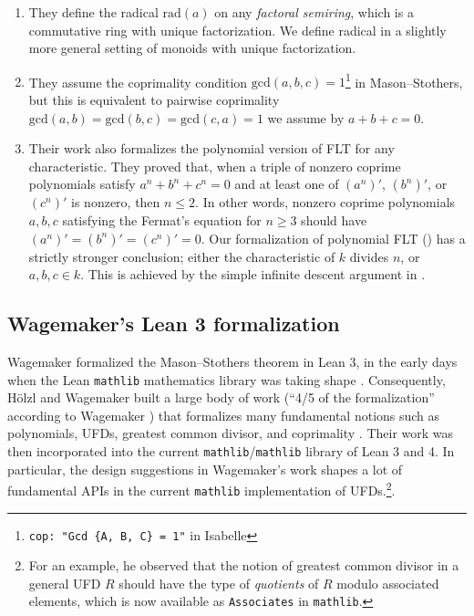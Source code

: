 \documentclass[runningheads]{llncs}
\newcommand{\rad}{\mathrm{rad}}
\begin{document}
\begin{enumerate}
\item They define the radical $\rad(a)$ on any \emph{factoral semiring}, which is a commutative ring with unique factorization. We define radical in a slightly more general setting of monoids with unique factorization.  

\item They assume the coprimality condition $\mathrm{gcd}(a, b, c) = 1$\footnote{\texttt{cop: "Gcd \{A, B, C\} = 1"} in Isabelle} in Mason--Stothers, but this is equivalent to pairwise coprimality $\mathrm{gcd}(a, b) = \mathrm{gcd}(b, c) = \mathrm{gcd}(c, a) = 1$ we assume by $a+b+c=0$.

\item Their work also formalizes the polynomial version of FLT for any characteristic.
They proved that, when a triple of nonzero coprime polynomials satisfy $a^n + b^n + c^n = 0$ and at least one of $(a^n)'$, $(b^n)'$, or $(c^n)'$ is nonzero,
 then $n \le 2$.
In other words, nonzero coprime polynomials $a, b, c$ satisfying the Fermat's equation for $n \ge 3$ should have $(a^n)' = (b^n)' = (c^n)' = 0$.
Our formalization of polynomial FLT () has a strictly stronger conclusion; either the characteristic of $k$ divides $n$, or $a, b, c \in k$.
This is achieved by the simple infinite descent argument in .
\end{enumerate}

\subsection{Wagemaker's Lean 3 formalization}
\label{subsec:comp-wagemaker}

Wagemaker formalized the Mason--Stothers theorem in Lean 3, in the early days when the Lean \texttt{mathlib} mathematics library was taking shape \cite{wagemaker-github,wagemaker18}.
Consequently, H\"{o}lzl and Wagemaker built a large body of work (``4/5 of the formalization'' according to Wagemaker \cite{wagemaker18})  that formalizes many fundamental notions such as polynomials,  UFDs, greatest common divisor, and coprimality \cite{wagemaker-github}.
Their work was then incorporated into the current \texttt{mathlib}/\texttt{mathlib} library of Lean 3 and 4.
In particular, the design suggestions \cite{wagemaker18} in Wagemaker's work shapes a lot of fundamental APIs in the current \texttt{mathlib} implementation of UFDs.\footnote{For an example, he observed that the notion of greatest common divisor in a general UFD $R$ should have the type of \emph{quotients} of $R$ modulo associated elements, which is now available as \texttt{Associates} in \texttt{mathlib}.}.
\end{document}
